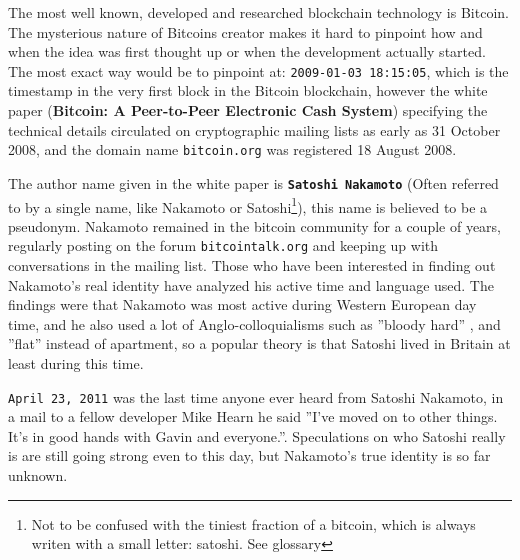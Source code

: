 The most well known, developed and researched blockchain technology is Bitcoin. 
The mysterious nature of Bitcoins creator makes it hard to pinpoint how
and when the idea was first thought up or when the development actually started. The
most exact way would be to pinpoint at:
\texttt{2009-01-03 18:15:05}\cite{genesis}, which is the timestamp in the very
first block in the Bitcoin blockchain, however the white paper (\textbf{Bitcoin:
A Peer-to-Peer Electronic Cash System})\cite{nakamoto_bitcoin} specifying the
technical details circulated on cryptographic mailing lists as early as 31
October 2008, and the domain name \texttt{bitcoin.org} was registered 18 August
2008.\cite{bernard_2018}


The author name given in the white paper is 
\textbf{\texttt{Satoshi Nakamoto}} (Often referred to by a single name, like Nakamoto or Satoshi\footnote{Not to be confused with the tiniest fraction of a bitcoin, which is always writen with a small letter: satoshi. See glossary}),
this name is believed to be a pseudonym. Nakamoto remained in the bitcoin
community for a couple of years, regularly posting on the forum
\texttt{bitcointalk.org} and keeping up with conversations in the mailing list.
Those who have been interested in finding out Nakamoto's real identity have
analyzed his active time and language used. The findings were that Nakamoto was
most active during Western European day time, and he also used a lot of
Anglo-colloquialisms such as ''bloody hard'' \cite{nakamoto_bloody}, and
''flat'' instead of apartment, so a popular theory is that Satoshi lived in
Britain at least during this time.\cite{bernard_2018}

\texttt{April 23, 2011} was the last time anyone ever heard from Satoshi
Nakamoto, in a mail to a fellow developer Mike Hearn he said ''I've moved on to
other things.  It's in good hands with Gavin and everyone.''.\cite{nakamoto_last_mail}
Speculations on who Satoshi really is are still going strong even to this day, but
Nakamoto's true identity is so far unknown.\cite{bernard_2018}\cite{jeffries_2013}
